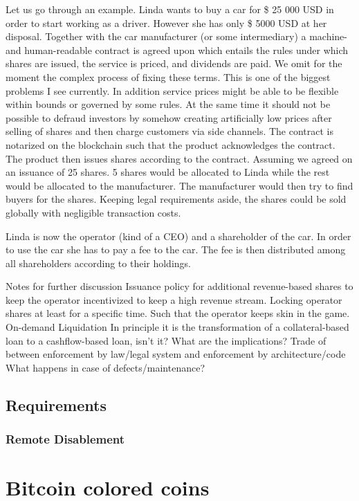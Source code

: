 Let us go through an example. Linda wants to buy a car for \$ 25 000 USD in order to start working as a driver. However she has only \$ 5000 USD at her disposal. Together with the car manufacturer (or some intermediary) a machine- and human-readable contract is agreed upon which entails the rules under which shares are issued, the service is priced, and dividends are paid. 
We omit for the moment the complex process of fixing these terms. This is one of the biggest problems I see currently. In addition service prices might be able to be flexible within bounds or governed by some rules. At the same time it should not be possible to defraud investors by somehow creating artificially low prices after selling of shares and then charge customers via side channels.
The contract is notarized on the blockchain such that the product acknowledges the contract. The product then issues shares according to the contract. Assuming we agreed on an issuance of 25 shares. 5 shares would be allocated to Linda while the rest would be allocated to the manufacturer. The manufacturer would then try to find buyers for the shares. Keeping legal requirements aside, the shares could be sold globally with negligible transaction costs. 

Linda is now the operator (kind of a CEO) and a shareholder of the car. In order to use the car she has to pay a fee to the car. The fee is then distributed among all shareholders according to their holdings. 
 
Notes for further discussion
Issuance policy for additional revenue-based shares to keep the operator incentivized to keep a high revenue stream.
Locking operator shares at least  for a specific time. Such that the operator keeps skin in the game.
On-demand Liquidation
In principle it is the transformation of a collateral-based loan to a cashflow-based loan, isn't it? What are the implications?
Trade of between enforcement by law/legal system and enforcement by architecture/code
What happens in case of defects/maintenance?





\subsection{Requirements}

\subsubsection{Remote Disablement}
\section{Bitcoin colored coins}

